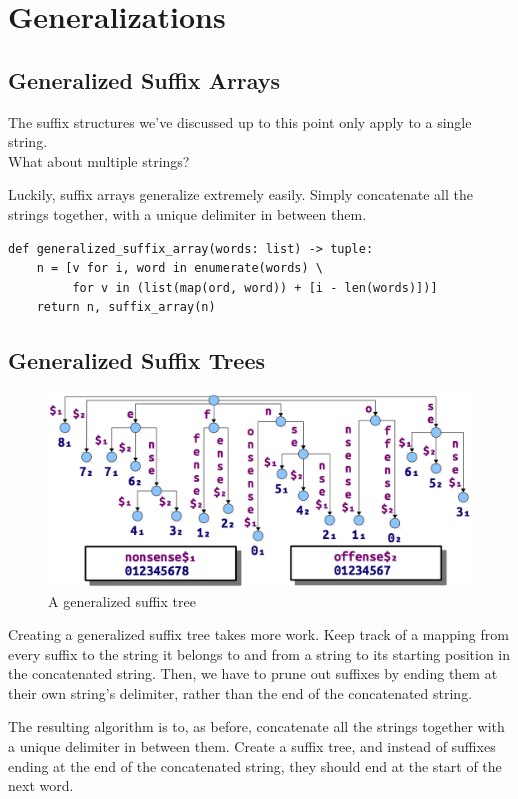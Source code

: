 \documentclass[11pt, oneside]{article}
\begin{document}
\section{Generalizations}
\subsection{Generalized Suffix Arrays}

The suffix structures we've discussed up to this point only apply to a single string. \\
What about multiple strings?

Luckily, suffix arrays generalize extremely easily.
Simply concatenate all the strings together, with a unique delimiter in between them.

\begin{verbatim}
def generalized_suffix_array(words: list) -> tuple:
    n = [v for i, word in enumerate(words) \
         for v in (list(map(ord, word)) + [i - len(words)])]
    return n, suffix_array(n)
\end{verbatim}

\subsection{Generalized Suffix Trees}

\begin{figure}[h!]
\centering
\includegraphics[scale=0.4]{general}
\caption{A generalized suffix tree}
\end{figure}

Creating a generalized suffix tree takes more work.
Keep track of a mapping from every suffix to the string it belongs to
and from a string to its starting position in the concatenated string.
Then, we have to prune out suffixes by ending them at their own string's delimiter, rather than the end of the concatenated string.

The resulting algorithm is to, as before, concatenate all the strings together with a unique delimiter in between them.
Create a suffix tree, and instead of suffixes ending at the end of the concatenated string, they should end at the start of the next word.
\end{document}
